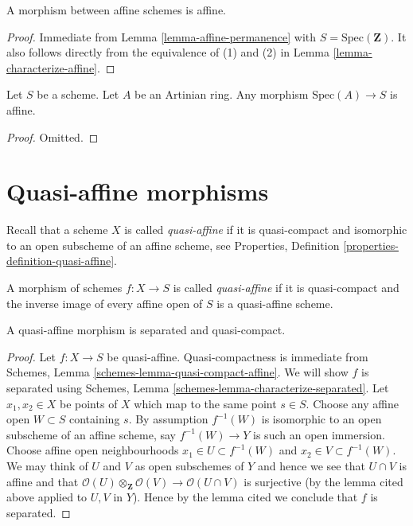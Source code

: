 \begin{lemma}
\label{lemma-morphism-affines-affine}
A morphism between affine schemes is affine.
\end{lemma}

\begin{proof}
Immediate from Lemma \ref{lemma-affine-permanence} with
$S = \text{Spec}(\mathbf{Z})$. It also follows directly from the
equivalence of (1) and (2) in Lemma \ref{lemma-characterize-affine}.
\end{proof}

\begin{lemma}
\label{lemma-Artinian-affine}
Let $S$ be a scheme.
Let $A$ be an Artinian ring.
Any morphism $\text{Spec}(A) \to S$ is affine.
\end{lemma}

\begin{proof}
Omitted.
\end{proof}









\section{Quasi-affine morphisms}
\label{section-quasi-affine}

\noindent
Recall that a scheme $X$ is called {\it quasi-affine} if it is quasi-compact
and isomorphic to an open subscheme of an affine scheme, see
Properties, Definition \ref{properties-definition-quasi-affine}.

\begin{definition}
\label{definition-quasi-affine}
A morphism of schemes $f : X \to S$ is called {\it quasi-affine} if
it is quasi-compact and the inverse image of every affine open
of $S$ is a quasi-affine scheme.
\end{definition}

\begin{lemma}
\label{lemma-quasi-affine-separated}
A quasi-affine morphism is separated and quasi-compact.
\end{lemma}

\begin{proof}
Let $f : X \to S$ be quasi-affine.
Quasi-compactness is immediate from
Schemes, Lemma \ref{schemes-lemma-quasi-compact-affine}.
We will show $f$ is separated using
Schemes, Lemma \ref{schemes-lemma-characterize-separated}. Let
$x_1, x_2 \in X$ be points of $X$ which map to the same point $s \in S$.
Choose any affine open $W \subset S$ containing $s$. By assumption
$f^{-1}(W)$ is isomorphic to an open subscheme of an affine scheme,
say $f^{-1}(W) \to Y$ is such an open immersion.
Choose affine open neighbourhoods $x_1 \in U \subset f^{-1}(W)$
and $x_2 \in V \subset f^{-1}(W)$. We may think of $U$ and $V$
as open subschemes of $Y$ and hence we see that
$U \cap V$ is affine and that
$\mathcal{O}(U) \otimes_{\mathbf{Z}} \mathcal{O}(V) \to \mathcal{O}(U \cap V)$
is surjective (by the lemma cited above applied to $U, V$ in $Y$).
Hence by the lemma cited we conclude that $f$ is separated.
\end{proof}

